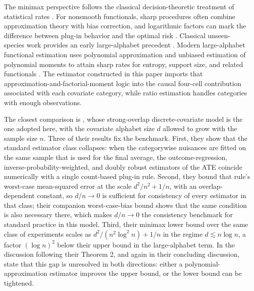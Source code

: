The minimax perspective follows the classical decision-theoretic treatment of statistical rates \citep{Bickel1993,VanDerVaart1998,Tsybakov2009}. For nonsmooth functionals, sharp procedures often combine approximation theory with bias correction, and logarithmic factors can mark the difference between plug-in behavior and the optimal risk \citep{Lepski1999,CaiLow2011}. Classical unseen-species work provides an early large-alphabet precedent \citep{Fisher1943,GoodToulmin1956,EfronThisted1976}. Modern large-alphabet functional estimation uses polynomial approximation and unbiased estimation of polynomial moments to attain sharp rates for entropy, support size, and related functionals \citep{Paninski2003,Valiant2011,Valiant2017,Orlitsky2016,WuYang2019,JiaoVenkatHanWeissman2015,WuYang2016,HanJiaoWeissman2015,HanJiaoWeissman2020}. The estimator constructed in this paper imports that approximation-and-factorial-moment logic into the causal four-cell contribution associated with each covariate category, while ratio estimation handles categories with enough observations.

The closest comparison is \citet{ZengBalakrishnanHanKennedy2024}, whose strong-overlap discrete-covariate model is the one adopted here, with the covariate alphabet size \(d\) allowed to grow with the sample size \(n\). Three of their results fix the benchmark. First, they show that the standard estimator class collapses: when the categorywise nuisances are fitted on the same sample that is used for the final average, the outcome-regression, inverse-probability-weighted, and doubly robust estimators of the ATE coincide numerically with a single count-based plug-in rule. Second, they bound that rule's worst-case mean-squared error at the scale \(d^2/n^2+1/n\), with an overlap-dependent constant, so \(d/n\to0\) is sufficient for consistency of every estimator in that class; their companion worst-case-bias bound shows that the same condition is also necessary there, which makes \(d/n\to0\) the consistency benchmark for standard practice in this model. Third, their minimax lower bound over the same class of experiments scales as \(d^2/(n^2\log^2 n)+1/n\) in the regime \(d\lesssim n\log n\), a factor \((\log n)^2\) below their upper bound in the large-alphabet term. In the discussion following their Theorem 2, and again in their concluding discussion, \citet{ZengBalakrishnanHanKennedy2024} state that this gap is unresolved in both directions: either a polynomial-approximation estimator improves the upper bound, or the lower bound can be tightened.

